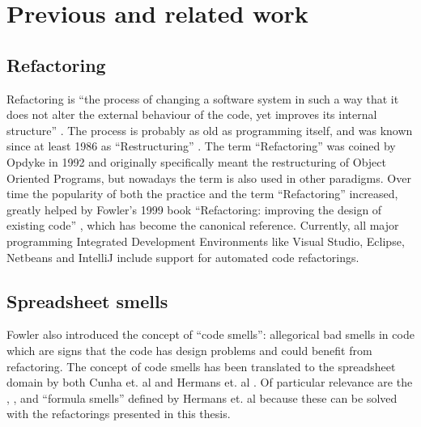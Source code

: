 
\chapter{Previous and related work}
\label{chapter:previouswork}

\section{Refactoring}

Refactoring is ``the process of changing a software system in such a way that it does not alter the external behaviour of the code, yet improves its internal structure'' \cite{opdyke1992refactoring}.
The process is probably as old as programming itself, and was known since at least 1986 as ``Restructuring'' \cite{arnold1986introduction}.
The term ``Refactoring'' was coined by Opdyke in 1992 \cite{opdyke1992refactoring} and originally specifically meant the restructuring of Object Oriented Programs, but nowadays the term is also used in other paradigms.
Over time the popularity of both the practice and the term ``Refactoring'' increased, greatly helped by Fowler's 1999 book ``Refactoring: improving the design of existing code'' \cite{fowler1999refactoring}, which has become the canonical reference.
Currently, all major programming Integrated Development Environments like Visual Studio, Eclipse, Netbeans and IntelliJ include support for automated code refactorings.

\section{Spreadsheet smells}

Fowler \cite{fowler1999refactoring} also introduced the concept of ``code smells'': allegorical bad smells in code which are signs that the code has design problems and could benefit from refactoring.
The concept of code smells has been translated to the spreadsheet domain by both Cunha et. al \cite{cunha2012towards} and Hermans et. al \cite{hermans2012detecting, DBLP:conf/icsm/Hermans212, hermans2014detecting}.
Of particular relevance are the , ,  and  ``formula smells'' defined by Hermans et. al \cite{DBLP:conf/icsm/Hermans212,hermans2014detecting} because these can be solved with the refactorings presented in this thesis.

